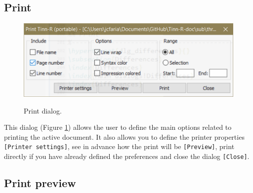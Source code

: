 \hypertarget{dlg_print}{}
\subsection{Print}

\begin{figure}[H]
  \includegraphics[scale=1]{./res/dlg_print.png} \\
  \caption{Print dialog.}
  \label{fig:dlg_print}
\end{figure}
This dialog
(Figure \ref{fig:dlg_print})
allows the user to define the main options related to printing the active document.
It also allows you to define the printer properties \texttt{[Printer settings]},
see in advance how the print will be \texttt{[Preview]},
print directly if you have already defined the preferences and close the dialog \texttt{[Close]}.


\hypertarget{dlg_print_preview}{}
\subsection{Print preview}

